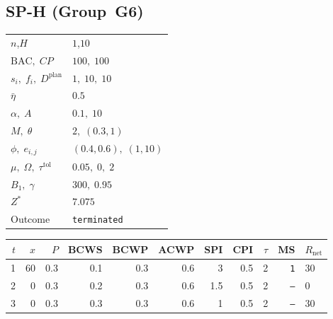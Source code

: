 \documentclass[12pt, a4paper]{article}
\newcommand{\BAC}{\mathrm{BAC}}
\begin{document}
\newpage

\subsection*{SP-H  (Group~G6)}
\begin{center}
\begin{tabular}{ll}
\toprule
$n$,\;$H$ & $1$,\;$10$ \\
$\BAC,\;CP$ & $100,\;100$ \\
$s_i,\;f_i,\;D^{\mathrm{plan}}$ & $1,\;10,\;10$ \\
$\bar\eta$ & $0.5$ \\
$\alpha,\;A$ & $0.1,\;10$ \\
$M,\;\theta$ & $2,\;(0.3,1)$ \\
$\phi,\;e_{i,j}$ & $(0.4,0.6),\;(1,10)$ \\
$\mu,\;\Omega,\;\tau^{\mathrm{tol}}$ & $0.05,\;0,\;2$ \\
$B_1,\;\gamma$ & $300,\;0.95$ \\
$Z^*$ & $7.075$ \\
Outcome & \texttt{terminated} \\
\bottomrule
\end{tabular}
\end{center}

\begin{center}
\begin{tabular}{rrrrrrrrrrl}
\toprule
$t$ & $x$ & $P$ & BCWS & BCWP & ACWP & SPI & CPI & $\tau$ & MS & $R_{\mathrm{net}}$\\
\midrule
1 & 60 & 0.3 & 0.1 & 0.3 & 0.6 & 3 & 0.5 & 2 & \texttt{1} & 30 \\
2 & 0 & 0.3 & 0.2 & 0.3 & 0.6 & 1.5 & 0.5 & 2 & \texttt{---} & 0 \\
3 & 0 & 0.3 & 0.3 & 0.3 & 0.6 & 1 & 0.5 & 2 & \texttt{---} & 30 \\
\bottomrule
\end{tabular}
\end{center}
\end{document}
